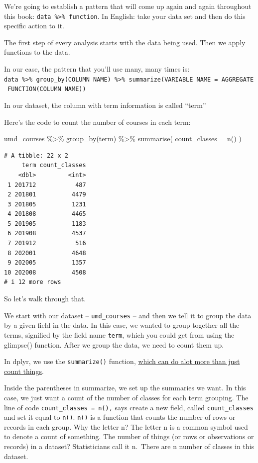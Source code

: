 \documentclass[
  letterpaper,
  DIV=11,
  numbers=noendperiod]{scrreprt}
\newenvironment{Shaded}{\begin{snugshade}}{\end{snugshade}}
\newcommand{\AttributeTok}[1]{\textcolor[rgb]{0.40,0.45,0.13}{#1}}
\newcommand{\FunctionTok}[1]{\textcolor[rgb]{0.28,0.35,0.67}{#1}}
\newcommand{\NormalTok}[1]{\textcolor[rgb]{0.00,0.23,0.31}{#1}}
\newcommand{\SpecialCharTok}[1]{\textcolor[rgb]{0.37,0.37,0.37}{#1}}
\begin{document}
We're going to establish a pattern that will come up again and again
throughout this book: \texttt{data\ \%\textgreater{}\%\ function}. In
English: take your data set and then do this specific action to it.

The first step of every analysis starts with the data being used. Then
we apply functions to the data.

In our case, the pattern that you'll use many, many times is:
\texttt{data\ \%\textgreater{}\%\ group\_by(COLUMN\ NAME)\ \%\textgreater{}\%\ summarize(VARIABLE\ NAME\ =\ AGGREGATE\ FUNCTION(COLUMN\ NAME))}

In our dataset, the column with term information is called ``term''

Here's the code to count the number of courses in each term:

\begin{Shaded}
\begin{Highlighting}[]
\NormalTok{umd\_courses }\SpecialCharTok{\%\textgreater{}\%}
  \FunctionTok{group\_by}\NormalTok{(term) }\SpecialCharTok{\%\textgreater{}\%}
  \FunctionTok{summarise}\NormalTok{(}
    \AttributeTok{count\_classes =} \FunctionTok{n}\NormalTok{()}
\NormalTok{  )}
\end{Highlighting}
\end{Shaded}

\begin{verbatim}
# A tibble: 22 x 2
     term count_classes
    <dbl>         <int>
 1 201712           487
 2 201801          4479
 3 201805          1231
 4 201808          4465
 5 201905          1183
 6 201908          4537
 7 201912           516
 8 202001          4648
 9 202005          1357
10 202008          4508
# i 12 more rows
\end{verbatim}

So let's walk through that.

We start with our dataset -- \texttt{umd\_courses} -- and then we tell
it to group the data by a given field in the data. In this case, we
wanted to group together all the terms, signified by the field name
\texttt{term}, which you could get from using the glimpse() function.
After we group the data, we need to count them up.

In dplyr, we use the \texttt{summarize()} function,
\href{http://dplyr.tidyverse.org/reference/summarise.html}{which can do
alot more than just count things}.

Inside the parentheses in summarize, we set up the summaries we want. In
this case, we just want a count of the number of classes for each term
grouping. The line of code \texttt{count\_classes\ =\ n(),} says create
a new field, called \texttt{count\_classes} and set it equal to
\texttt{n()}. \texttt{n()} is a function that counts the number of rows
or records in each group. Why the letter n? The letter n is a common
symbol used to denote a count of something. The number of things (or
rows or observations or records) in a dataset? Statisticians call it
n.~There are n number of classes in this dataset.
\end{document}
